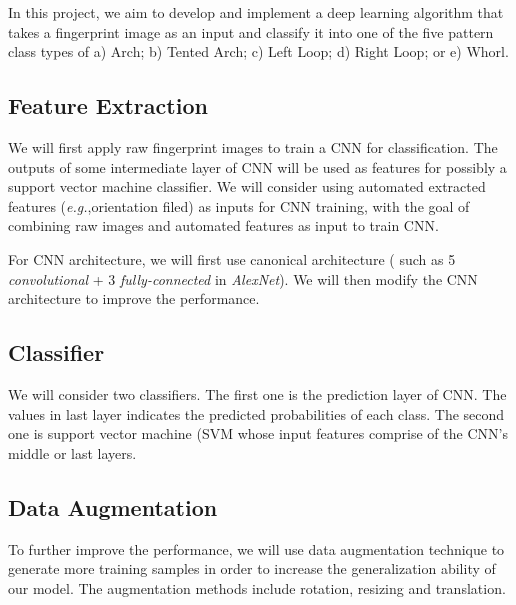 
In this project, we aim to develop and implement a deep learning algorithm that takes a fingerprint image as an input and classify it into one of the five pattern class types of a) Arch; b) Tented Arch; c) Left Loop; d) Right Loop; or e) Whorl. 

\subsection{Feature Extraction}
%
We will first apply raw fingerprint images to train a CNN for classification. The outputs of some intermediate layer  of CNN will be used as features for possibly a support vector machine classifier.
%
We will consider using automated extracted features (\textit{e.g.},orientation filed) as inputs for CNN training, with the goal of combining raw images and automated features as input to train CNN.

For CNN architecture, we will first use canonical architecture ( such as 5 \textit{convolutional} + 3 \textit{fully-connected} in \textit{AlexNet}\cite{krizhevsky2012imagenet}). We will then modify the CNN architecture to improve the performance.
%
\subsection{Classifier}
%
We will consider two classifiers. The first one is the prediction layer of CNN. The values in last layer indicates the predicted probabilities of each class.
%
The second one is support vector machine (SVM whose input features comprise of the CNN’s middle or last layers.

\subsection{Data Augmentation}
%
To further improve the performance, we will use data augmentation technique to generate more training samples in order to increase the generalization ability of our model. 
%
The augmentation methods include rotation, resizing and translation.


